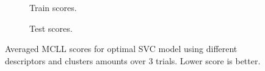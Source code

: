 \begin{figure}[ht]
    \centering
    \begin{subfigure}{.45\textwidth}
        \centering
        \captionsetup{width=0.9\linewidth}
        \captionsetup{justification=centering}
        \caption{Train scores.}
    \end{subfigure}
    \hspace{1cm}
    \begin{subfigure}{.45\textwidth}
        \centering
        \captionsetup{width=0.9\linewidth}
        \captionsetup{justification=centering}
        \caption{Test scores.}
    \end{subfigure}
    \captionsetup{width=0.8\linewidth}
    \captionsetup{justification=centering}
    \caption{Averaged MCLL scores for optimal SVC model using different descriptors and clusters amounts over 3 trials. Lower score is better.}
    \label{fig:3-clusters}
\end{figure}


